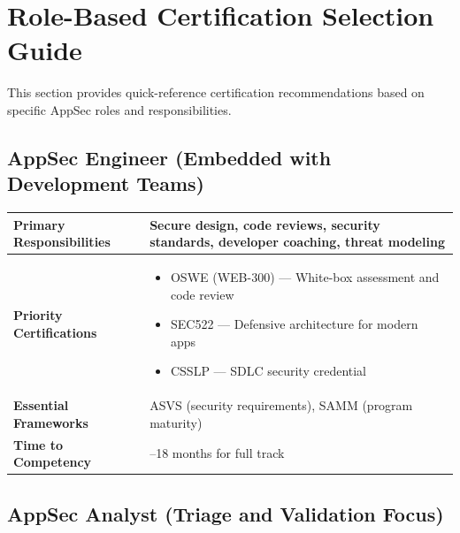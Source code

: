 \documentclass[11pt,letterpaper]{article}
\begin{document}
\section{Role-Based Certification Selection Guide}

This section provides quick-reference certification recommendations based on specific AppSec roles and responsibilities.

\subsection{AppSec Engineer (Embedded with Development Teams)}

\begin{table}[H]
\centering
\begin{tabularx}{\textwidth}{l >{\raggedright\arraybackslash}X}
\toprule
\textbf{Primary Responsibilities} & Secure design, code reviews, security standards, developer coaching, threat modeling \\
\midrule
\textbf{Priority Certifications} & \begin{itemize}[nosep,leftmargin=*]
    \item OSWE (WEB-300) --- White-box assessment and code review
    \item SEC522 --- Defensive architecture for modern apps
    \item CSSLP --- SDLC security credential
\end{itemize} \\
\midrule
\textbf{Essential Frameworks} & ASVS (security requirements), SAMM (program maturity) \\
\midrule
\textbf{Time to Competency} & 12--18 months for full track \\
\bottomrule
\end{tabularx}
\end{table}

\subsection{AppSec Analyst (Triage and Validation Focus)}
\end{document}
